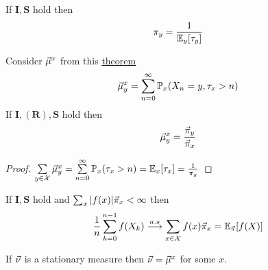 \documentclass[12pt,a4paper]{article}
\begin{document}
\begin{thm}\label{uniquedist}
If $\mathbf{I}, \mathbf{S}$ hold then 
\begin{align*}
\pi_y = \frac{1}{\mathbb{E}_y[\tau_y]}
\end{align*}
\end{thm}

\begin{thm}[]\label{thm611}
Consider $\va\mu^x$ from this \hyperref[thm411]{theorem}
\begin{align*}
\va\mu^x_y = \sum\limits_{n=0}^{\infty} \mathbb{P}_x(X_n=y, \tau_x > n)
\end{align*}
If $\mathbf{I}, (\mathbf{R}), \mathbf{S}$ hold then 
\begin{align*}
\va\mu^x_y  = \frac{\va\pi_y}{\va\pi_x}
\end{align*} 
\end{thm}
\begin{proof}
$\sum\limits_{y\in \mathcal{X}}^{}\va\mu_y^x = \sum\limits_{n=0}^{\infty}\mathbb{P}_x(\tau_x > n) = \mathbb{E}_x[\tau_x] = \frac{1}{\pi_y}$
\end{proof}
\begin{thm}\label{expfun}
If $\mathbf{I}, \mathbf{S}$ hold and $\sum_x |f(x)|\va\pi_x < \infty$ then 
\begin{align*}
\frac{1}{n}\sum\limits_{k=0}^{n-1}f(X_k) \overset{a.s}{\longrightarrow} \sum\limits_{x\in \mathcal{X}}^{}f(x)\va\pi_x = \mathbb{E}_{\va\pi}[f(X)]
\end{align*}
\end{thm}
\begin{thm}
If $\va\nu$ is a stationary measure then $\va\nu = \va\mu^x$ for some $x$. 
\end{thm}
\newpage
\end{document}
